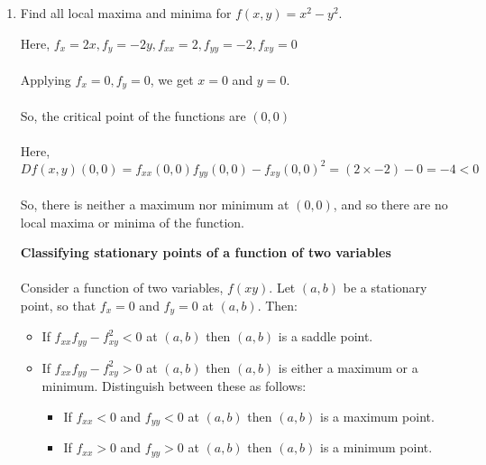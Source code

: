\begin{enumerate}
\begin{answer}
	\end{answer}
	\item  Find all local maxima and minima for $f(x, y)=x^{2}-y^{2}$.
	\begin{answer}
		Here, $f_{x}=2 x, f_{y}=-2 y, f_{x x}=2, f_{y y}=-2, f_{x y}=0$\\\\
		Applying $f_{x}=0, f_{y}=0$, we get $x=0$ and $y=0 .$ \\\\So, the critical point of the functions are $(0,0)$\\\\
		Here, ${Df(x,y)}(0,0)=f_{x x}(0,0) f_{y y}(0,0)-f_{x y}(0,0)^{2}=(2 \times-2)-0=-4<0$\\\\
		So, there is neither a maximum nor minimum at $(0,0)$, and so there are no local maxima or minima of the function.
		\begin{note}
			\textbf{Classifying stationary points of a function of two variables}\\\\
			Consider a function of two variables, $f(x y)$. Let $(a, b)$ be a stationary point, so that $f_{x}=0$ and $f_{y}=0$ at $(a, b)$. Then:
			\begin{itemize}
				\item  If $f_{x x} f_{y y}-f_{x y}^{2}<0$ at $(a, b)$ then $(a, b)$ is a saddle point.\\
				\item  If $f_{x x} f_{y y}-f_{x y}^{2}>0$ at $(a, b)$ then $(a, b)$ is either a maximum or a minimum. Distinguish between these as follows:\\
				
				\begin{itemize}
					\item  If $f_{x x}<0$ and $f_{y y}<0$ at $(a, b)$ then $(a, b)$ is a maximum point.\\
					\item If $f_{x x}>0$ and $f_{y y}>0$ at $(a, b)$ then $(a, b)$ is a minimum point.\\
				\end{itemize}
				

\end{itemize}
\end{note}
\end{answer}
\end{enumerate}
